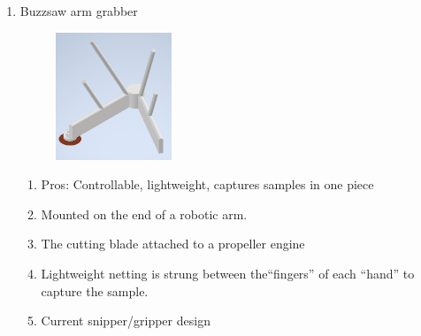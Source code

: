 \begin{enumerate}
\item Buzzsaw arm grabber
\begin{figure}
\begin{center}
\includegraphics[height=1.5in]{figures/robotarmmech8.png}
\end{center}
\end{figure}
\begin{enumerate}
\item Pros: Controllable, lightweight, captures samples in one piece
\item Mounted on the end of a robotic arm. 
\item The cutting blade attached to a propeller engine
\item Lightweight netting is strung between the``fingers'' of each ``hand'' to capture the sample.
\item Current snipper/gripper design 
\end{enumerate}
\end{enumerate}
